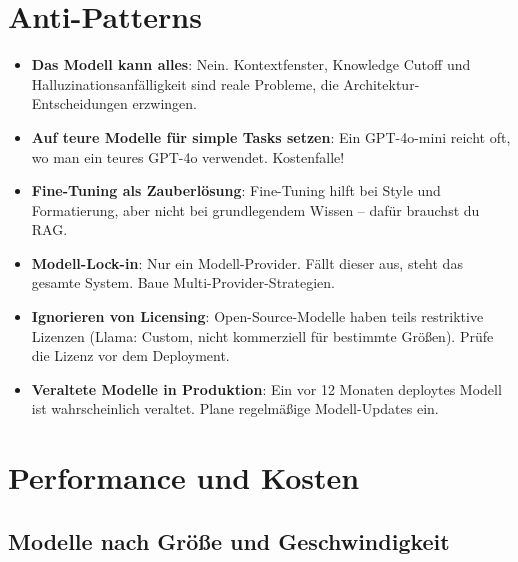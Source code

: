 \section{Anti-Patterns}

\begin{itemize}[leftmargin=*]
    \item \textbf{Das Modell kann alles}: Nein. Kontextfenster, Knowledge Cutoff und Halluzinationsanfälligkeit sind reale Probleme, die Architektur-Entscheidungen erzwingen.
    \item \textbf{Auf teure Modelle für simple Tasks setzen}: Ein GPT-4o-mini reicht oft, wo man ein teures GPT-4o verwendet. Kostenfalle!
    \item \textbf{Fine-Tuning als Zauberlösung}: Fine-Tuning hilft bei Style und Formatierung, aber nicht bei grundlegendem Wissen -- dafür brauchst du RAG.
    \item \textbf{Modell-Lock-in}: Nur ein Modell-Provider. Fällt dieser aus, steht das gesamte System. Baue Multi-Provider-Strategien.
    \item \textbf{Ignorieren von Licensing}: Open-Source-Modelle haben teils restriktive Lizenzen (Llama: Custom, nicht kommerziell für bestimmte Größen). Prüfe die Lizenz vor dem Deployment.
    \item \textbf{Veraltete Modelle in Produktion}: Ein vor 12 Monaten deploytes Modell ist wahrscheinlich veraltet. Plane regelmäßige Modell-Updates ein.
\end{itemize}

\section{Performance und Kosten}

\subsection{Modelle nach Größe und Geschwindigkeit}

